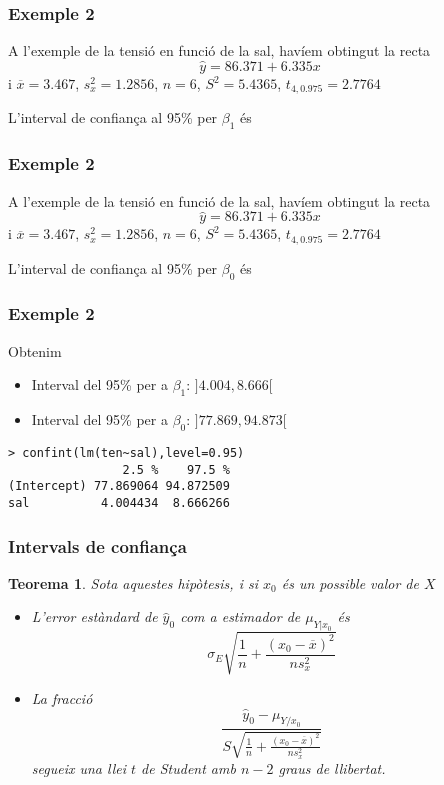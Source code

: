 \documentclass[12pt,t]{beamer}
\theoremstyle{plain}
\newtheorem{teorema}{Teorema}
\theoremstyle{definition}
\begin{document}
\begin{frame}
\frametitle{Exemple 2}


A l'exemple de la tensió en funció de la sal, havíem obtingut la recta
$$
\widehat{y}=86.371+6.335x
$$
i $\overline{x}=3.467$, $s_x^2=1.2856$, $n=6$, $S^2=5.4365$, $t_{4,0.975}=2.7764$
\medskip

L'interval de confiança al 95\% per $\beta_1$ és

\end{frame}

\begin{frame}
\frametitle{Exemple 2}
\vspace*{-2ex}

A l'exemple de la tensió en funció de la sal, havíem obtingut la recta
$$
\widehat{y}=86.371+6.335x
$$
i $\overline{x}=3.467$, $s_x^2=1.2856$, $n=6$, $S^2=5.4365$, $t_{4,0.975}=2.7764$
\medskip

L'interval de confiança al 95\% per $\beta_0$ és

\end{frame}


\begin{frame}[fragile]
\frametitle{Exemple 2}
\vspace*{-2ex}

Obtenim
\begin{itemize}
\item Interval del 95\% per a $\beta_1$:  $]4.004,8.666[$
\medskip

\item Interval del 95\% per a $\beta_0$:   $]77.869, 94.873[$
\end{itemize}
\begin{verbatim}
> confint(lm(ten~sal),level=0.95)
                2.5 %    97.5 %
(Intercept) 77.869064 94.872509
sal          4.004434  8.666266
\end{verbatim}

\end{frame}



\begin{frame}
\frametitle{Intervals de confiança}
\begin{teorema}
Sota aquestes hipòtesis, i si $x_0$ és un possible valor de $X$
\begin{itemize}
\item L'error estàndard de $\widehat{y}_0$ com a estimador de $\mu_{Y|x_0}$ és
$$
\sigma_E\sqrt{\frac{1}{n}+\frac{(x_0-\overline{x})^2}{ns^2_x}}
$$

\item La fracció
$$
\frac{\widehat{y}_0-\mu_{Y/x_0}}{S\sqrt{\frac{1}{n}+\frac{(x_0-\overline{x})^2}{n
s^2_x}}}$$
segueix una llei $t$ de Student amb $n-2$ graus de llibertat.
\end{itemize}
\end{teorema}
\end{frame}
\end{document}
